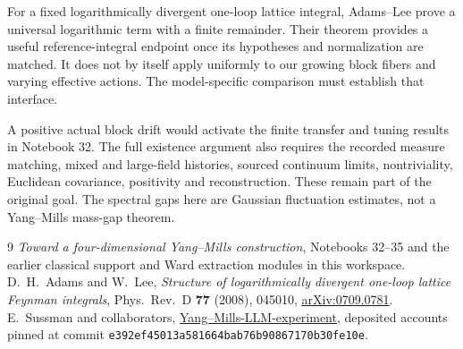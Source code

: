 \documentclass[11pt]{article}
\theoremstyle{remark}
\begin{document}
For a fixed logarithmically divergent one-loop lattice integral,
Adams--Lee prove a universal logarithmic term with a finite remainder.
Their theorem provides a useful reference-integral endpoint once
its hypotheses and normalization are matched. It does not by itself
apply uniformly to our growing block fibers and varying effective
actions. The model-specific comparison must establish that interface.

A positive actual block drift would activate the finite transfer
and tuning results in Notebook 32. The full existence argument also
requires the recorded measure matching, mixed and large-field
histories, sourced continuum limits, nontriviality, Euclidean
covariance, positivity and reconstruction. These remain part of the
original goal. The spectral gaps here are Gaussian fluctuation
estimates, not a Yang--Mills mass-gap theorem.

\begin{thebibliography}{9}
\emph{Toward a four-dimensional Yang--Mills construction},
Notebooks 32--35 and the earlier classical support and Ward
extraction modules in this workspace.
D.~H.~Adams and W.~Lee,
\emph{Structure of logarithmically divergent one-loop lattice
Feynman integrals}, Phys.\ Rev.\ D \textbf{77} (2008), 045010,
\href{https://arxiv.org/abs/0709.0781}{arXiv:0709.0781}.
E.~Sussman and collaborators,
\href{https://github.com/ethanwsussman/Yang--Mills-LLM-experiment}
{Yang--Mills-LLM-experiment}, deposited accounts pinned at
commit \texttt{e392ef4501\allowbreak 3a581664ba\allowbreak b76b908671\allowbreak 70b30fe10e}.
\end{thebibliography}
\end{document}
